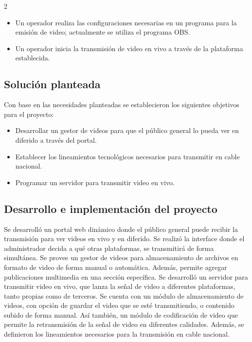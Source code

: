 \documentclass[12pt,spanish,Letterpaper,openany]{book}
\providecommand{\tightlist}{%
  \setlength{\itemsep}{0pt}\setlength{\parskip}{0pt}}
\newcommand{\spacethreemilis}{\vspace{3mm}}
\newcommand{\spacetwomilis}{\vspace{2mm}}
\begin{document}
\begin {multicols}{2}
\spacetwomilis

\begin{itemize}
\tightlist
\item
  Un operador realiza las configuraciones necesarias en un programa para la emisión de video; actualmente se utiliza el programa OBS.
\end{itemize}

\spacetwomilis

\begin{itemize}
\tightlist
\item
  Un operador inicia la transmisión de video en vivo a través de la plataforma establecida.
\end{itemize}

\spacethreemilis

\hypertarget{solucion-planteada}{%
\subsection{Solución planteada}\label{solucion-planteada}}

Con base en las necesidades planteadas se establecieron los siguientes objetivos para el proyecto:

\begin{itemize}
\tightlist
\item
  Desarrollar un gestor de videos para que el público general lo pueda ver en diferido a través del portal.
\item
  Establecer los lineamientos tecnológicos necesarios para transmitir en cable nacional.
\item
  Programar un servidor para transmitir video en vivo.
\end{itemize}

\spacethreemilis

\hypertarget{desarrollo-e-implementacion-del-proyecto}{%
\subsection{Desarrollo e implementación del proyecto}\label{desarrollo-e-implementacion-del-proyecto}}

Se desarrolló un portal web dinámico donde el público general puede recibir la transmisión para ver videos en vivo y en diferido. Se realizó la interface donde el administrador decida a qué otras plataformas, se transmitirá de forma simultánea. Se provee un gestor de videos para almacenamiento de archivos en formato de video de forma manual o automática. Además, permite agregar publicaciones multimedia en una sección específica. Se desarrolló un servidor para transmitir video en vivo, que lanza la señal de video a diferentes plataformas, tanto propias como de terceros. Se cuenta con un módulo de almacenamiento de videos, con opción de guardar el video que se esté transmitiendo, o contenido subido de forma manual. Así también, un módulo de codificación de video que permite la retransmisión de la señal de video en diferentes calidades. Además, se definieron los lineamientos necesarios para la transmisión en cable nacional.


\end{multicols}
\end{document}
